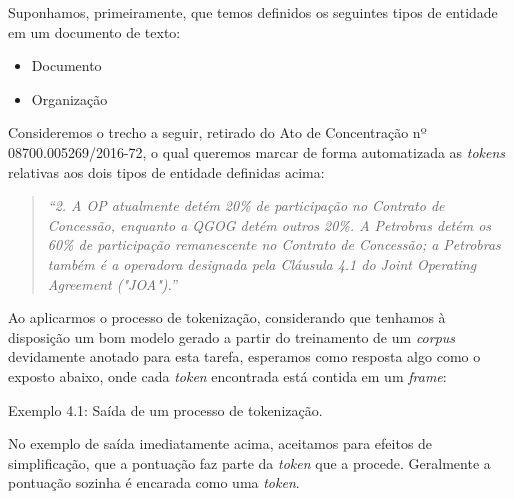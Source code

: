 \documentclass[11pt]{report}
\newcommand{\quotes}[1]{``#1''}
\begin{document}
Suponhamos, primeiramente, que temos definidos os seguintes tipos de entidade em um documento de texto:

\begin{itemize}
  \item Documento
  \item Organização
\end{itemize}

Consideremos o trecho a seguir, retirado do Ato de Concentração nº 08700.005269/2016-72, o qual queremos marcar de forma automatizada as \textit{tokens} relativas
aos dois tipos de entidade definidas acima:

\begin{quote}
  \textit{\quotes{2. A OP atualmente detém 20\% de participação no Contrato de Concessão, enquanto a QGOG detém outros 20\%.
  A Petrobras detém os 60\% de participação remanescente no Contrato de Concessão; a Petrobras também é a operadora designada
  pela Cláusula 4.1 do Joint Operating Agreement ("JOA").}}
\end{quote}

Ao aplicarmos o processo de tokenização, considerando que tenhamos à disposição um bom modelo gerado a partir do treinamento de um \textit{corpus} devidamente anotado para esta tarefa,
esperamos como resposta algo como o exposto abaixo, onde cada \textit{token} encontrada está contida em um \textit{frame}:

\begin{quote}
             
       
              
       
         
\end{quote}
\begin{center}
  Exemplo 4.1: Saída de um processo de tokenização.
\end{center}

No exemplo de saída imediatamente acima, aceitamos para efeitos de simplificação, que a pontuação faz parte da \textit{token} que a procede.
Geralmente a pontuação sozinha é encarada como uma \textit{token}.
\end{document}
